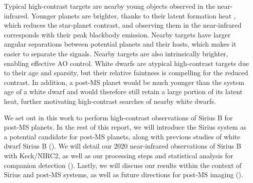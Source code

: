 \documentclass[twocolumn]{aastex631}
\begin{document}
Typical high-contrast targets are nearby young objects observed in the near-infrared. Younger planets are brighter, thanks to their latent formation heat \citep{fortneyGiantPlanetInterior2010}, which reduces the star-planet contrast, and observing them in the near-infrared corresponds with their peak blackbody emission. Nearby targets have larger angular separations between potential planets and their hosts, which makes it easier to separate the signals. Nearby targets are also intrinsically brighter, enabling effective AO control. White dwarfs are atypical high-contrast targets due to their age and sparsity, but their relative faintness is compelling for the reduced contrast. In addition, a post-MS planet would be much younger than the system age of a white dwarf and would therefore still retain a large portion of its latent heat, further motivating high-contrast searches of nearby white dwarfs.

We set out in this work to perform high-contrast observations of Sirius B for post-MS planets. In the rest of this report, we will introduce the Sirius system as a potential candidate for post-MS planets, along with previous studies of white dwarf Sirius B (). We will detail our 2020 near-infrared observations of Sirius B with Keck/NIRC2, as well as our processing steps and statistical analysis for companion detection (). Lastly, we will discuss our results within the context of Sirius and post-MS systems, as well as future directions for post-MS imaging ().



\end{document}
